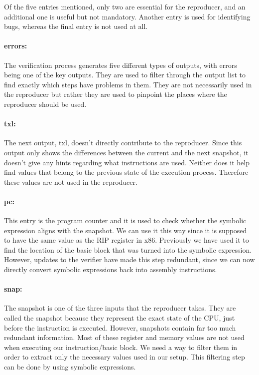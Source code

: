 Of the five entries mentioned, only two are essential for the reproducer, and an additional one is useful but not mandatory.
Another entry is used for identifying bugs, whereas the final entry is not used at all.

\paragraph{errors:}
The verification process generates five different types of outputs, with errors being one of the key outputs.
They are used to filter through the output list to find exactly which steps have problems in them.
They are not necessarily used in the reproducer but rather they are used to pinpoint the places where the reproducer should be used.

\paragraph{txl:}
The next output, txl, doesn't directly contribute to the reproducer.
Since this output only shows the differences between the current and the next snapshot, it doesn't give any hints regarding what instructions are used.
Neither does it help find values that belong to the previous state of the execution process.
Therefore these values are not used in the reproducer.

\paragraph{pc:}
This entry is the program counter and it is used to check whether the symbolic expression aligns with the snapshot.
We can use it this way since it is supposed to have the same value as the RIP register in x86.
Previously we have used it to find the location of the basic block that was turned into the symbolic expression.
However, updates to the verifier have made this step redundant, since we can now directly convert symbolic expressions back into assembly instructions.

\paragraph{snap:}
The snapshot is one of the three inputs that the reproducer takes.
They are called the snapshot because they represent the exact state of the CPU, just before the instruction is executed.
However, snapshots contain far too much redundant information.
Most of these register and memory values are not used when executing our instruction/basic block.
We need a way to filter them in order to extract only the necessary values used in our setup.
This filtering step can be done by using symbolic expressions. 

